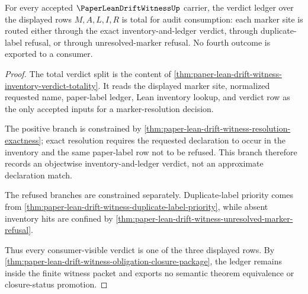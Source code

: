 \begin{theorem}
\label{thm:paperleandriftwitness-verdict-ledger-totality}
For every accepted $\PaperLeanDriftWitnessUp$ carrier, the verdict ledger over the displayed rows $M,A,L,I,R$ is total for audit consumption: each marker site is routed either through the exact inventory-and-ledger verdict, through duplicate-label refusal, or through unresolved-marker refusal. No fourth outcome is exported to a consumer.
\end{theorem}
\begin{proof}
The total verdict split is the content of \autoref{thm:paper-lean-drift-witness-inventory-verdict-totality}. It reads the displayed marker site, normalized requested name, paper-label ledger, Lean inventory lookup, and verdict row as the only accepted inputs for a marker-resolution decision.

The positive branch is constrained by \autoref{thm:paper-lean-drift-witness-resolution-exactness}; exact resolution requires the requested declaration to occur in the inventory and the same paper-label row not to be refused. This branch therefore records an objectwise inventory-and-ledger verdict, not an approximate declaration match.

The refused branches are constrained separately. Duplicate-label priority comes from \autoref{thm:paper-lean-drift-witness-duplicate-label-priority}, while absent inventory hits are confined by \autoref{thm:paper-lean-drift-witness-unresolved-marker-refusal}.

Thus every consumer-visible verdict is one of the three displayed rows. By \autoref{thm:paper-lean-drift-witness-obligation-closure-package}, the ledger remains inside the finite witness packet and exports no semantic theorem equivalence or closure-status promotion.
\end{proof}

